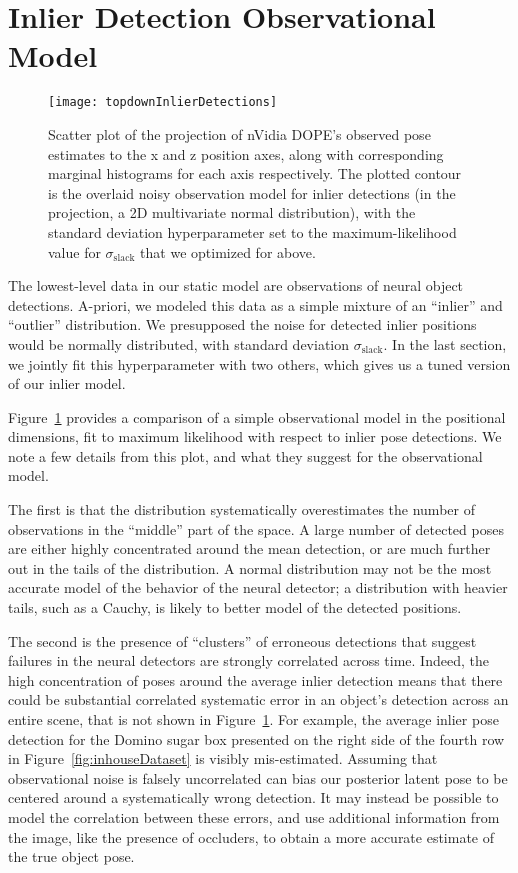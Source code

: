 \section{Inlier Detection Observational Model}
\begin{figure}[H]
  \texttt{[image: topdownInlierDetections]}
  \caption{
    Scatter plot of the projection of nVidia DOPE's observed pose estimates to the x and z position axes, along with corresponding marginal histograms for each axis respectively.
    The plotted contour is the overlaid noisy observation model for inlier detections (in the projection, a 2D multivariate normal distribution), with the standard deviation hyperparameter set to the maximum-likelihood value for $\sigma_\mathrm{slack}$ that we optimized for above.
  }
  \label{fig:topdownInlierDetections}
\end{figure}
The lowest-level data in our static model are observations of neural object detections.
A-priori, we modeled this data as a simple mixture of an ``inlier'' and ``outlier'' distribution.
We presupposed the noise for detected inlier positions would be normally distributed, with standard deviation $\sigma_\mathrm{slack}$.
In the last section, we jointly fit this hyperparameter with two others, which gives us a tuned version of our inlier model.

Figure~\ref{fig:topdownInlierDetections} provides a comparison of a simple observational model in the positional dimensions, fit to maximum likelihood with respect to inlier pose detections.
We note a few details from this plot, and what they suggest for the observational model.

The first is that the distribution systematically overestimates the number of observations in the ``middle'' part of the space.
A large number of detected poses are either highly concentrated around the mean detection, or are much further out in the tails of the distribution.
A normal distribution may not be the most accurate model of the behavior of the neural detector; a distribution with heavier tails, such as a Cauchy, is likely to better model of the detected positions.

The second is the presence of ``clusters'' of erroneous detections that suggest failures in the neural detectors are strongly correlated across time.
Indeed, the high concentration of poses around the average inlier detection means that there could be substantial correlated systematic error in an object's detection across an entire scene, that is not shown in Figure~\ref{fig:topdownInlierDetections}.
For example, the average inlier pose detection for the Domino sugar box presented on the right side of the fourth row in Figure~\ref{fig:inhouseDataset} is visibly mis-estimated.
Assuming that observational noise is falsely uncorrelated can bias our posterior latent pose to be centered around a systematically wrong detection.
It may instead be possible to model the correlation between these errors, and use additional information from the image, like the presence of occluders, to obtain a more accurate estimate of the true object pose.

